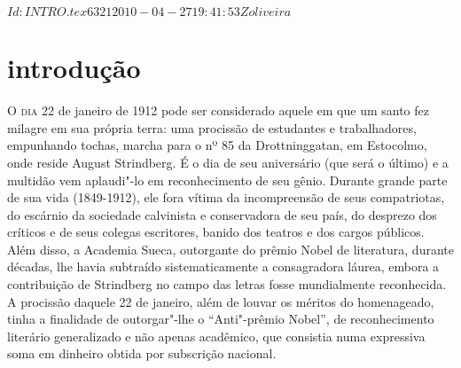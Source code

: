 \SVN $Id: INTRO.tex 6321 2010-04-27 19:41:53Z oliveira $ 
\chapter[Introdução, por Ivo Barroso]{introdução}


\noindent\textsc{O dia 22} de janeiro de 1912 pode ser considerado aquele em que um santo
fez milagre em sua própria terra: uma procissão de estudantes e
trabalhadores, empunhando tochas, marcha para o nº 85 da
Drottninggatan, em Estocolmo, onde reside August Strindberg. É o dia de
seu aniversário (que será o último) e a multidão vem aplaudi"-lo em
reconhecimento de seu gênio. Durante grande parte de sua vida
(1849-1912), ele fora vítima da incompreensão de seus compatriotas,
do escárnio da sociedade calvinista e conservadora de seu país, do
desprezo dos críticos e de seus colegas escritores, banido dos teatros
e dos cargos públicos. Além disso, a Academia Sueca, outorgante do
prêmio Nobel de literatura, durante décadas, lhe havia subtraído
sistematicamente a consagradora láurea, embora a contribuição de
Strindberg no campo das letras fosse mundialmente reconhecida. A
procissão daquele 22 de janeiro, além de louvar os méritos do
homenageado, tinha a finalidade de outorgar"-lhe o ``Anti"-prêmio
Nobel'', de reconhecimento literário generalizado e não apenas
acadêmico, que consistia numa expressiva soma em dinheiro obtida por
subscrição nacional.

